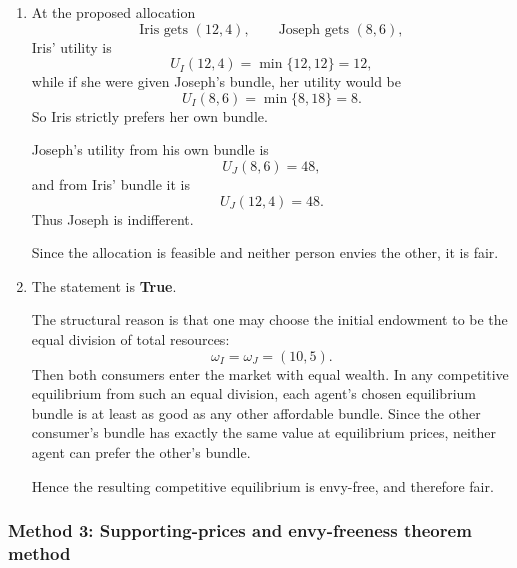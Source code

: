 \documentclass[12pt]{article}
\begin{document}
\begin{enumerate}[label=(\alph*)]
    \item
    At the proposed allocation
    \[
    \text{Iris gets }(12,4),\qquad \text{Joseph gets }(8,6),
    \]
    Iris' utility is
    \[
    U_I(12,4)=\min\{12,12\}=12,
    \]
    while if she were given Joseph's bundle, her utility would be
    \[
    U_I(8,6)=\min\{8,18\}=8.
    \]
    So Iris strictly prefers her own bundle.

    Joseph's utility from his own bundle is
    \[
    U_J(8,6)=48,
    \]
    and from Iris' bundle it is
    \[
    U_J(12,4)=48.
    \]
    Thus Joseph is indifferent.

    Since the allocation is feasible and neither person envies the other, it is fair.

    \item
    The statement is \textbf{True}.

    The structural reason is that one may choose the initial endowment to be the equal division of total resources:
    \[
    \omega_I=\omega_J=(10,5).
    \]
    Then both consumers enter the market with equal wealth. In any competitive equilibrium from such an equal division, each agent's chosen equilibrium bundle is at least as good as any other affordable bundle. Since the other consumer's bundle has exactly the same value at equilibrium prices, neither agent can prefer the other's bundle.

    Hence the resulting competitive equilibrium is envy-free, and therefore fair.
\end{enumerate}

\newpage
\subsubsection{Method 3: Supporting-prices and envy-freeness theorem method}
\end{document}
